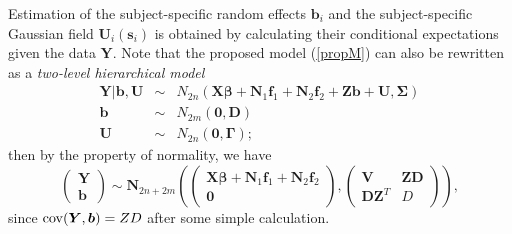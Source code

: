\documentclass[12pt, notitlepage]{article}
\begin{document}
Estimation of the subject-specific random effects $\boldsymbol b_i$ and the subject-specific Gaussian field $\boldsymbol U_i(\boldsymbol s_i)$ is obtained by calculating their conditional expectations given the data $\boldsymbol Y$.
Note that the proposed model (\ref{propM}) can also be rewritten as a {\it two-level hierarchical model}
\begin{eqnarray}
\boldsymbol Y| \boldsymbol b, \boldsymbol U 
&\sim&
N_{2n} \left(\boldsymbol{X}\boldsymbol{\beta} +
 \boldsymbol N_{1} \boldsymbol f_1 + 
  \boldsymbol N_{2} \boldsymbol f_2 + 
\boldsymbol{Z}\boldsymbol{b} + \boldsymbol U,  
\boldsymbol \Sigma \right) \label{condM}\\ 
\boldsymbol b &\sim& N_{2m} (\boldsymbol 0, \boldsymbol D)   \label{bDis} \\
\boldsymbol U &\sim& N_{2n} (\boldsymbol 0, \boldsymbol \Gamma); \nonumber
\end{eqnarray}
then by the property of normality, we have 
 \[
 \begin{pmatrix}
  \boldsymbol Y \\
  \boldsymbol b
 \end{pmatrix}
 \sim 
 \boldsymbol N_{2n + 2m} 
 \left(
 \begin{pmatrix}
 \boldsymbol{X}\boldsymbol{\beta} + \boldsymbol N_{1} \boldsymbol f_1 +  \boldsymbol N_{2} \boldsymbol f_2 \\
\boldsymbol 0
 \end{pmatrix},
  \begin{pmatrix}
  \boldsymbol V &  \boldsymbol Z\boldsymbol D \\
  \boldsymbol D\boldsymbol Z^T & D 
 \end{pmatrix}
 \right),
\]
since ${\rm cov} (\bm Y, \bm b) = ZD$ after some simple calculation.
\end{document}
